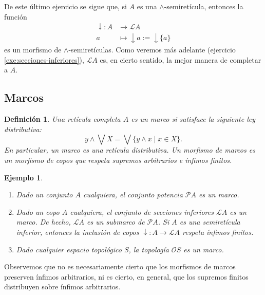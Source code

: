 \documentclass[12pt,letterpaper,titlepage]{article}
\newtheorem*{defn}{Definición}
\newtheorem*{exa}{Ejemplo}
\theoremstyle{definition}
\newcommand\Sup{\bigvee}
\newcommand\down{{\downarrow}}
\renewcommand\inf{\wedge}
\renewcommand\cal[1]{\mathcal{#1}}
\newcommand\<{\langle}
\renewcommand\>{\rangle}
\begin{document}
De este último ejercicio se sigue que, si $A$ es una
$\inf$-semiretícula, entonces la función
\begin{align*}
    \down : A&\to \cal LA \\
    a&\mapsto \down a:=\down\{a\}
\end{align*}
es un morfismo de $\inf$-semiretículas.
Como veremos más adelante (ejercicio \ref{exe:secciones-inferiores}),
$\cal LA$ es, en cierto sentido, la mejor manera de completar a $A$.

\subsection{Marcos}
\begin{defn}
    Una retícula completa $A$ es un marco si satisface la siguiente
    ley distributiva:
    \[
        y\inf\Sup X = \Sup\{y\inf x\mid x\in X\}
    .\]
    En particular, un marco es una retícula distributiva.
    Un morfismo de marcos es un morfismo de copos que respeta
    supremos arbitrarios e ínfimos finitos.
\end{defn}

\begin{exa}
    \begin{enumerate}
        \item Dado un conjunto $A$ cualquiera, el conjunto potencia
        $\cal PA$ es un marco.
        \item Dado un copo $A$ cualquiera, el conjunto de secciones
        inferiores $\cal LA$ es un marco. De hecho, $\cal LA$ es un
        submarco de $\cal PA$.
        Si $A$ es una semiretícula inferior, entonces la inclusión
        de copos $\down:A\to\cal LA$ respeta ínfimos finitos.
        \item Dado cualquier espacio topológico $S$, la topología
        $\cal OS$ es un marco.
    \end{enumerate}
\end{exa}

Observemos que no es necesariamente cierto que los morfismos de
marcos preserven ínfimos arbitrarios, ni es cierto, en general,
que los supremos finitos distribuyen sobre ínfimos arbitrarios.
\end{document}
